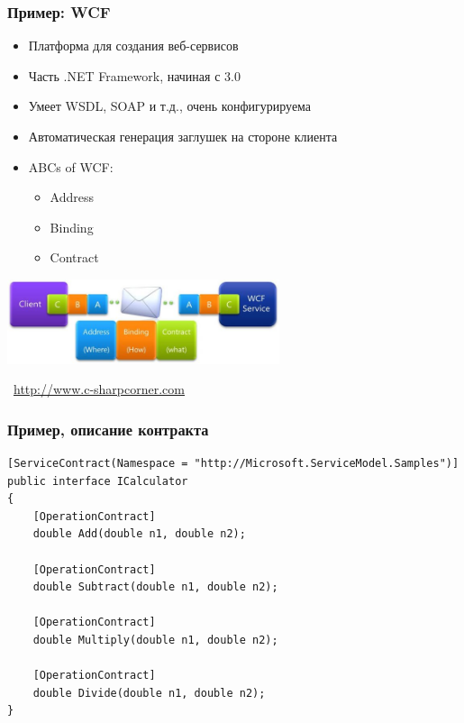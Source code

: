 \documentclass[xetex,mathserif,serif]{beamer}
\newcommand{\attribution}[1] {
    \vspace{-5mm}\begin{flushright}\begin{scriptsize}\textcolor{gray}{\textcopyright\, #1}\end{scriptsize}\end{flushright}
}
\begin{document}
    \begin{frame}
        \frametitle{Пример: WCF}
        \begin{itemize}
            \item Платформа для создания веб-сервисов
            \item Часть .NET Framework, начиная с 3.0
            \item Умеет WSDL, SOAP и т.д., очень конфигурируема
            \item Автоматическая генерация заглушек на стороне клиента
            \item ABCs of WCF:
            \begin{itemize}
                \item Address
                \item Binding
                \item Contract
            \end{itemize}
        \end{itemize}
        \begin{center}
            \includegraphics[width=0.6\textwidth]{wcf.png}
            \attribution{\url{http://www.c-sharpcorner.com}}
        \end{center}
    \end{frame}

    \begin{frame}[fragile]
        \frametitle{Пример, описание контракта}
        \begin{small}
            \begin{verbatim}
[ServiceContract(Namespace = "http://Microsoft.ServiceModel.Samples")]  
public interface ICalculator  
{
    [OperationContract]
    double Add(double n1, double n2);

    [OperationContract]
    double Subtract(double n1, double n2);

    [OperationContract]
    double Multiply(double n1, double n2);

    [OperationContract]
    double Divide(double n1, double n2);
}
            \end{verbatim}
        \end{small}
    \end{frame}
\end{document}
